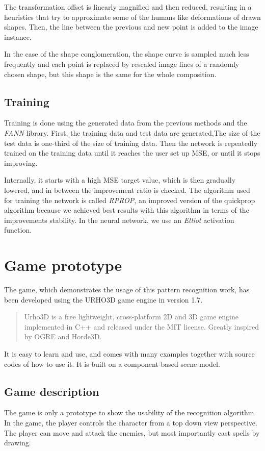 The transformation  offset is linearly magnified and then reduced, resulting in a heuristics that try to approximate some of the humans like deformations of drawn shapes. Then, the line between the previous and new point is added to the image instance. 

In the case of the shape conglomeration, the shape curve is sampled much less frequently and each point is replaced by rescaled image lines of a randomly chosen shape, but this shape is the same for the whole composition. 

\subsection{Training}
Training is done using the generated data from the previous methods and the \emph{FANN} library. 
First, the training data and test data are generated,The size of the test data is one-third of the size of training data. Then the network is repeatedly trained on the training data until it reaches the user set up MSE, or until it stops improving.

Internally, it starts with a high MSE target value, which is then gradually lowered, and in between the improvement ratio is checked. The algorithm used for training the network is called \emph{RPROP}, an improved version of the quickprop algorithm because we achieved best results with this algorithm in terms of the improvements stability. In the neural network, we use an \emph{Elliot} activation function.

\section{Game prototype}
The game, which demonstrates the usage of this pattern recognition work, has been developed using the URHO3D game engine in version 1.7. \begin{quotation} Urho3D is a free lightweight, cross-platform 2D and 3D game engine implemented in C++ and released under the MIT license. Greatly inspired by OGRE and Horde3D. \end{quotation} It is easy to learn and use, and comes with many examples together with source codes of how to use it. It is built on a component-based scene model. 

\subsection{Game description}
The game is only a prototype to show the usability of the recognition algorithm. In the game, the player controls the character from a top down view perspective. The player can move and attack the enemies, but most importantly cast spells by drawing. 

